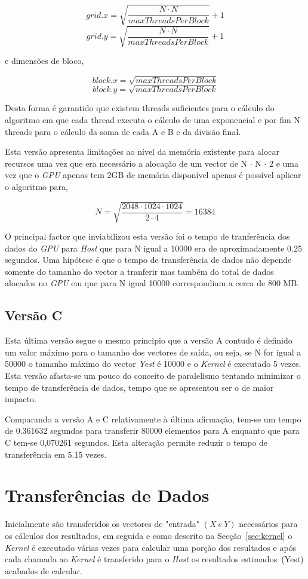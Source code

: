 \[grid.x = \sqrt{\frac{N\cdot N}{maxThreadsPerBlock}} + 1\]
\[grid.y = \sqrt{\frac{N\cdot N}{maxThreadsPerBlock}} + 1\]

e dimensões de bloco,

\[block.x = \sqrt{maxThreadsPerBlock}\]
\[block.y = \sqrt{maxThreadsPerBlock}\]

Desta forma é garantido que existem threads suficientes para o cálculo do algoritmo em que cada thread executa o cálculo de uma exponencial e por fim N threads para o cálculo da soma de cada A e B e da divisão final.

Esta versão apresenta limitações ao nível da memória existente para alocar recursos uma vez que era necessário a alocação de um vector de N $\cdot$ N $\cdot$ 2 e uma vez que o \textit{GPU} apenas tem 2GB de memória disponível apenas é possível aplicar o algoritmo para, 

\[N = \sqrt{\frac{2048\cdot 1024\cdot 1024}{2\cdot 4}} = 16384\]

O principal factor que inviabilizou esta versão foi o tempo de tranferência dos dados do \textit{GPU} para \textit{Host} que para N igual a 10000 era de aproximadamente 0.25 segundos. Uma hipótese é que o tempo de transferência de dados não depende somente do tamanho do vector a tranferir mas também do total de dados alocados no \textit{GPU} em que para N igual 10000 correspondiam a cerca de 800 MB.

\subsection{Versão C}

Esta última versão segue o mesmo príncipio que a versão A contudo é definido um valor máximo para o tamanho dos vectores de saída, ou seja, se N for igual a 50000 o tamanho máximo do vector \textit{Yest} é 10000 e o \textit{Kernel} é executado 5 vezes. Esta versão afasta-se um pouco do conceito de paralelismo tentando minimizar o tempo de transferência de dados, tempo que se apresentou ser o de maior impacto.

Comparando a versão A e C relativamente à última afirmação, tem-se um tempo de 0.361632 segundos para transferir 80000 elementos para A enquanto que para C tem-se 0,070261 segundos. Esta alteração permite reduzir o tempo de transferência em 5.15 vezes.


\section{Transferências de Dados}
Inicialmente são transferidos os vectores de "entrada" \mbox{$(X\ e\ Y)$} necessários para os cálculos dos resultados, em seguida e como descrito na Secção~\ref{sec:kernel} o \textit{Kernel} é executado várias vezes para calcular uma porção dos resultados e após cada chamada ao \textit{Kernel} é transferido para o \textit{Host} os resultados estimados~(Yest) acabados de calcular.

